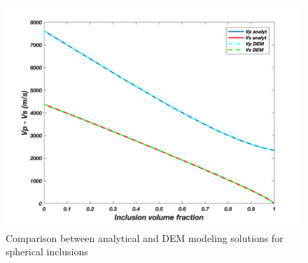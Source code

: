 \begin{figure}[ht]
    \centering
    \includegraphics[width=1.0\textwidth]{EXEV/DEM_spheres.png}
    \caption{Comparison between analytical and DEM modeling solutions for spherical inclusions}
    \label{fig:dem_benchmark}
\end{figure}


